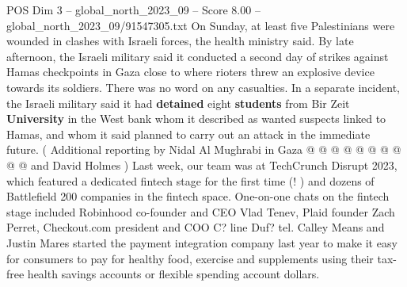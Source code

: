 \begin{textsample}{POS Dim 3 – global\_north\_2023\_09 – Score 8.00 – global\_north\_2023\_09/91547305.txt}
On Sunday, at least five Palestinians were wounded in clashes with Israeli forces, the health ministry said.
By late afternoon, the Israeli military said it conducted a second day of strikes against Hamas checkpoints in Gaza close to where rioters threw an explosive device towards its soldiers.
There was no word on any casualties.
In a separate incident, the Israeli military said it had \textbf{detained} eight \textbf{students} from Bir Zeit \textbf{University} in the West bank whom it described as wanted suspects linked to Hamas, and whom it said planned to carry out an attack in the immediate future. ( Additional reporting by Nidal Al Mughrabi in Gaza @ @ @ @ @ @ @ @ @ @ and David Holmes ) Last week, our team was at TechCrunch Disrupt 2023, which featured a dedicated fintech stage for the first time (! ) and dozens of Battlefield 200 companies in the fintech space.
One-on-one chats on the fintech stage included Robinhood co-founder and CEO Vlad Tenev, Plaid founder Zach Perret, Checkout.com president and COO C? line Duf? tel.
Calley Means and Justin Mares started the payment integration company last year to make it easy for consumers to pay for healthy food, exercise and supplements using their tax-free health savings accounts or flexible spending account dollars.

\end{textsample}
